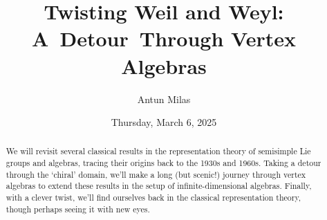 \documentclass{UAmathtalk}
\author{Antun Milas}
\title{Twisting Weil and Weyl: A~Detour~Through Vertex Algebras}
\date{Thursday, March 6, 2025}
\begin{document}
\maketitle

\begin{abstract}
We will revisit several classical results in the representation theory of semisimple Lie groups and algebras, tracing their origins back to the 1930s and 1960s. Taking a detour through the `chiral' domain,  we’ll make a long  (but scenic!) journey through vertex algebras to extend these results in the setup of infinite-dimensional algebras. Finally, with a clever twist, we’ll find ourselves back in the classical representation theory, though perhaps seeing it with new eyes.
\end{abstract}
\end{document}
